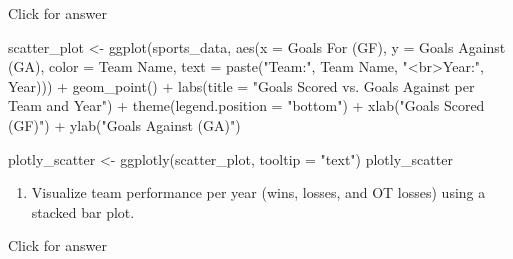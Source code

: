 \documentclass[
]{book}
\newenvironment{Shaded}{\begin{snugshade}}{\end{snugshade}}
\newcommand{\AttributeTok}[1]{\textcolor[rgb]{0.77,0.63,0.00}{#1}}
\newcommand{\FunctionTok}[1]{\textcolor[rgb]{0.00,0.00,0.00}{#1}}
\newcommand{\NormalTok}[1]{#1}
\newcommand{\OtherTok}[1]{\textcolor[rgb]{0.56,0.35,0.01}{#1}}
\newcommand{\SpecialCharTok}[1]{\textcolor[rgb]{0.00,0.00,0.00}{#1}}
\newcommand{\StringTok}[1]{\textcolor[rgb]{0.31,0.60,0.02}{#1}}
\providecommand{\tightlist}{%
  \setlength{\itemsep}{0pt}\setlength{\parskip}{0pt}}
\begin{document}
Click for answer

\begin{Shaded}
\begin{Highlighting}[]
\NormalTok{scatter\_plot }\OtherTok{\textless{}{-}} \FunctionTok{ggplot}\NormalTok{(sports\_data, }\FunctionTok{aes}\NormalTok{(}\AttributeTok{x =} \StringTok{\textasciigrave{}}\AttributeTok{Goals For (GF)}\StringTok{\textasciigrave{}}\NormalTok{, }\AttributeTok{y =} \StringTok{\textasciigrave{}}\AttributeTok{Goals Against (GA)}\StringTok{\textasciigrave{}}\NormalTok{, }\AttributeTok{color =} \StringTok{\textasciigrave{}}\AttributeTok{Team Name}\StringTok{\textasciigrave{}}\NormalTok{, }\AttributeTok{text =} \FunctionTok{paste}\NormalTok{(}\StringTok{"Team:"}\NormalTok{, }\StringTok{\textasciigrave{}}\AttributeTok{Team Name}\StringTok{\textasciigrave{}}\NormalTok{, }\StringTok{"\textless{}br\textgreater{}Year:"}\NormalTok{, Year))) }\SpecialCharTok{+}
  \FunctionTok{geom\_point}\NormalTok{() }\SpecialCharTok{+}
  \FunctionTok{labs}\NormalTok{(}\AttributeTok{title =} \StringTok{"Goals Scored vs. Goals Against per Team and Year"}\NormalTok{) }\SpecialCharTok{+}
  \FunctionTok{theme}\NormalTok{(}\AttributeTok{legend.position =} \StringTok{"bottom"}\NormalTok{) }\SpecialCharTok{+}
  \FunctionTok{xlab}\NormalTok{(}\StringTok{"Goals Scored (GF)"}\NormalTok{) }\SpecialCharTok{+}
  \FunctionTok{ylab}\NormalTok{(}\StringTok{"Goals Against (GA)"}\NormalTok{) }
\end{Highlighting}
\end{Shaded}

\begin{Shaded}
\begin{Highlighting}[]
\NormalTok{plotly\_scatter }\OtherTok{\textless{}{-}} \FunctionTok{ggplotly}\NormalTok{(scatter\_plot, }\AttributeTok{tooltip =} \StringTok{"text"}\NormalTok{)}
\NormalTok{plotly\_scatter}
\end{Highlighting}
\end{Shaded}

\begin{enumerate}
\def\labelenumi{\arabic{enumi}.}
\setcounter{enumi}{5}
\tightlist
\item
  Visualize team performance per year (wins, losses, and OT losses) using a stacked bar plot.
\end{enumerate}

Click for answer
\end{document}

